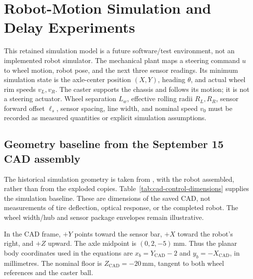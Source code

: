 \clearpage
\section{Robot-Motion Simulation and Delay Experiments}
\label{sec:motion-control}
This retained simulation model is a future software/test environment, not an implemented robot simulator. The mechanical plant maps a steering command $u$ to wheel motion, robot pose, and the next three sensor readings. Its minimum simulation state is the axle-center position $(X,Y)$, heading $\theta$, and actual wheel rim speeds $v_L,v_R$. The caster supports the chassis and follows its motion; it is not a steering actuator. Wheel separation $L_w$, effective rolling radii $R_L,R_R$, sensor forward offset $\ell_s$, sensor spacing, line width, and nominal speed $v_0$ must be recorded as measured quantities or explicit simulation assumptions.

\subsection{Geometry baseline from the September 15 CAD assembly}
The historical simulation geometry is taken from , with the robot assembled, rather than from the exploded copies. Table~\ref{tab:cad-control-dimensions} supplies the simulation baseline. These are dimensions of the saved CAD, not measurements of tire deflection, optical response, or the completed robot. The wheel width/hub and sensor package envelopes remain illustrative.

In the CAD frame, $+Y$ points toward the sensor bar, $+X$ toward the robot's right, and $+Z$ upward. The axle midpoint is $(0,2,-5)$\,mm. Thus the planar body coordinates used in the equations are $x_b=Y_{\mathrm{CAD}}-2$ and $y_b=-X_{\mathrm{CAD}}$, in millimetres. The nominal floor is $Z_{\mathrm{CAD}}=-20$\,mm, tangent to both wheel references and the caster ball.

